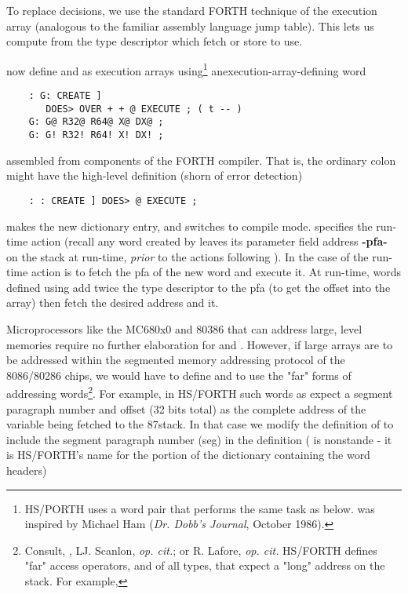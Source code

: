 To replace decisions, we use the standard FORTH technique of the execution array (analogous to the familiar assembly language jump table). This lets us compute from the type descriptor which fetch or store to use.

 now define  and  as execution arrays using\footnote{HS/PORTH uses a word pair  that performs the same task as  below.  was inspired by Michael Ham (\textit{Dr. Dobb's Journal}, October 1986).} anexecution-array-defining word 

\begin{lstlisting}
    : G: CREATE ]
       DOES> OVER + + @ EXECUTE ; ( t -- )
    G: G@ R32@ R64@ X@ DX@ ;
    G: G! R32! R64! X! DX! ;
\end{lstlisting}

assembled from components of the FORTH compiler. That is, the ordinary colon \bc{:} might have the high-level definition (shorn of error detection)

\begin{lstlisting}
    : : CREATE ] DOES> @ EXECUTE ;
\end{lstlisting}

 makes the new dictionary entry, and \bc{]} switches to
compile mode.  specifies the run-time action (recall any word created by  leaves its parameter field address
\textbf{-pfa-} on the stack at run-time, \textit{prior} to the actions following ). In the case of \bc{:} the run-time action is to fetch the pfa of the new word and execute it. At run-time, words defined using  add twice the type descriptor to the pfa (to get the offset into the array) then fetch the desired address and  it.

Microprocessors like the MC680x0 and 80386 that can address large, level memories require no further elaboration for  and . However, if large arrays are to be addressed within the segmented memory addressing protocol of the 8086/80286 chips, we would have to define  and  to use the "far" forms of addressing words\footnote{Consult, \eg, LJ. Scanlon, \textit{op. cit.}; or R. Lafore, \textit{op. cit.} HS/FORTH defines "far" access operators,  and  of all types, that expect a "long" address on the stack. For example, }. For example, in HS/FORTH such words as  expect a segment paragraph number and offset (32 bits total) as the complete address of the variable being fetched to the 87stack. In that case we modify the definition of  to include the segment paragraph number (seg) in the definition ( is nonstande - it is HS/FORTH's name for the portion of the dictionary containing the word headers)

